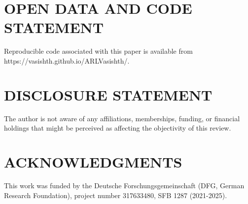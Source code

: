 \documentclass{ar-1col}\usepackage[]{graphicx}\usepackage[]{color}
\begin{document}
\section{OPEN DATA AND CODE STATEMENT}

Reproducible code associated with this paper is available from  https://vasishth.github.io/ARLVasishth/.

\section*{DISCLOSURE STATEMENT}
The author is not aware of any affiliations, memberships, funding, or financial holdings that
might be perceived as affecting the objectivity of this review. 

\section*{ACKNOWLEDGMENTS}

This work was funded by the Deutsche Forschungsgemeinschaft (DFG, German Research Foundation), project number 317633480, SFB 1287 (2021-2025). 


 

\end{document}
